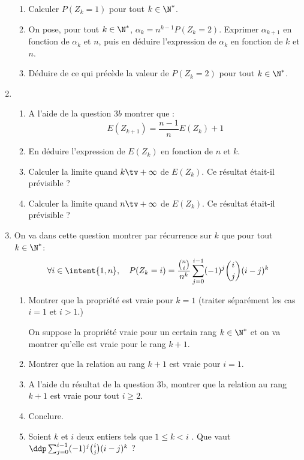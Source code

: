 \begin{probleme}
\begin{enumerate}
\begin{enumerate}
\item Calculer $P(Z_k=1)$ pour tout $k\in \N^*$.

\item On pose, pour tout $k\in \N^*$, $\alpha_k =n^{k-1} P(Z_k =2)$. Exprimer $\alpha_{k+1} $ en fonction de $\alpha_k$ et $n$, puis en déduire l'expression de $\alpha_k$ en fonction de $k$ et $n$. 

\item Déduire de ce qui précède  la valeur de $P(Z_k=2) $ pour tout $k\in \N^*$. 
\end{enumerate}
\item \begin{enumerate}
\item A l'aide de la question $3b$ montrer que :
$$E(Z_{k+1}) = \frac{n-1}{n} E(Z_k) +1$$
\item En déduire l'expression de $E(Z_k)$ en fonction de $n$ et $k$. 
\item Calculer la limite quand $k\tv +\infty$ de $E(Z_k)$. Ce résultat  était-il prévisible ? 
\item  Calculer la limite quand $n\tv +\infty$ de $E(Z_k)$. Ce résultat  était-il prévisible ? 


\end{enumerate}
\item On va dans cette question montrer par récurrence sur $k$ que pour tout $k\in \N^*$:
$$\forall i\in \intent{ 1, n}, \quad P(Z_k =i) =\frac{\binom{n}{i}}{n^k} \sum_{j=0}^{i-1} (-1)^j \binom{i}{j}(i-j)^k$$
\begin{enumerate}
\item Montrer que la propriété est vraie pour $k=1$ (traiter séparément les cas $i=1$ et $i>1$.) 


On suppose la propriété vraie pour un certain rang $k\in \N^*$ et on va montrer qu'elle est vraie pour le rang $k+1$. 
\item Montrer que la relation au rang $k+1$ est vraie pour $i=1$. 



\item A l'aide du résultat de la question 3b, montrer que la relation au rang $k+1$ est vraie pour tout $i\geq 2$. 



\item Conclure. 

\item Soient $k$ et $i$ deux entiers tels que $1\leq k < i $ . Que vaut $\ddp \sum_{j=0}^{i-1} (-1)^j \binom{i}{j}(i-j)^k$ ?



\end{enumerate}

\end{enumerate}
\end{probleme}






